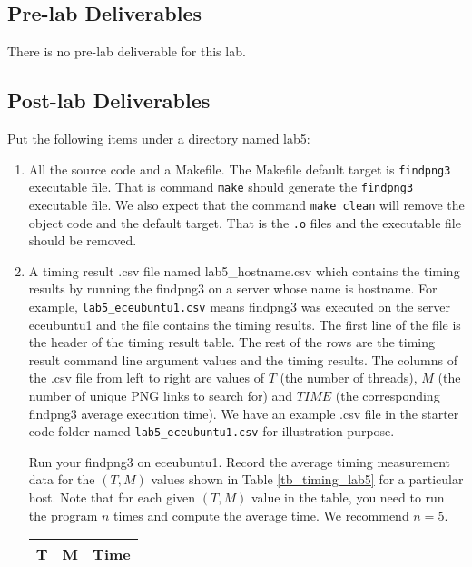 \subsection{Pre-lab Deliverables}
There is no pre-lab deliverable for this lab.

\subsection{Post-lab Deliverables}
\label{sec:lab5:postlab}
Put the following items under a directory named lab5:
\begin{enumerate}
\item All the source code and a Makefile. The Makefile default target is \verb+findpng3+ executable file. That is command \verb+make+ should generate the \verb+findpng3+ executable file. We also expect that the command \verb+make clean+ will remove the object code and the default target. That is the \verb+.o+ files and the executable file should be removed.
\item A timing result .csv file named lab5\_hostname.csv 
  which contains the timing results by running the findpng3 on a server whose name is hostname. For example, \verb+lab5_eceubuntu1.csv+ means findpng3 was executed on the server eceubuntu1 and the file contains the timing results.
  The first line of the file is the header of the timing result table. The rest of the rows are the timing result command line argument values and the timing results. The columns of the .csv file from left to right are values of $T$ (the number of threads), $M$ (the number of unique PNG links to search for) and $TIME$ (the corresponding findpng3 average execution time). We have an example .csv file in the starter code folder named \verb+lab5_eceubuntu1.csv+ for illustration purpose.

  Run your findpng3 on eceubuntu1. Record the average timing measurement data for the $(T, M)$ values shown in Table \ref{tb_timing_lab5} for a particular host. Note that for each given $(T, M)$ value in the table, you need to run the program $n$ times and compute the average time. We recommend $n=5$.
\begin{table}[h]
\begin{center}
\begin{tabular}{|c|c|c|}
\hline
T     & M    & Time \\ \hline


\end{tabular}
\end{center}
\end{table}
\end{enumerate}
